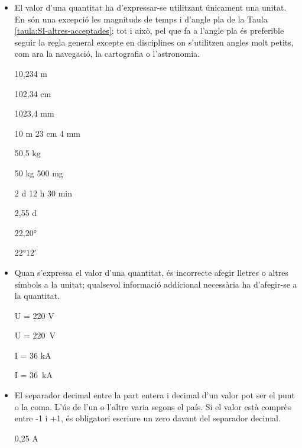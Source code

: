 \begin{itemize}
\textcolor{Red}\faTimesCircle{}   \qty{20}{\ohm.m} són 20 ohm  per metre

\textcolor{Red}\faTimesCircle{}   \qty{20}{\ohm.m} són 20 ohm multiplicat per metre


\item El valor d'una quantitat ha d'expressar-se  utilitzant únicament una unitat. En són una excepció les magnituds de temps i d'angle pla de la Taula \vref{taula:SI-altres-acceptades}; tot i això, pel que fa a l'angle pla és preferible seguir la regla general excepte en disciplines on s'utilitzen angles molt petits, com ara la navegació, la cartografia o l'astronomia.

\textcolor{Green}\faCheckSquare{} 10,234 m

\textcolor{Green}\faCheckSquare{} 102,34 cm

\textcolor{Green}\faCheckSquare{} 1023,4 mm

\textcolor{Red}\faTimesCircle{}  10 m 23 cm 4 mm

\textcolor{Green}\faCheckSquare{} 50,5 kg


\textcolor{Red}\faTimesCircle{}  50 kg 500 mg

\textcolor{Green}\faCheckSquare{} 2 d 12 h 30 min

\textcolor{Red}\faTimesCircle{}   2,55 d

\textcolor{Green}\faCheckSquare{} \ang{22,20}

\textcolor{Blue}\faExclamationTriangle{} \ang{22;12}

\item Quan s'expressa el valor d'una quantitat, és incorrecte afegir
lletres o altres símbols a la unitat; qualsevol informació
addicional necessària ha d'afegir-se a la quantitat.

\textcolor{Green}\faCheckSquare{} U = 220 V

\textcolor{Red}\faTimesCircle{}  U = \qty{220}{V}

\textcolor{Green}\faCheckSquare{}  I = 36 kA

\textcolor{Red}\faTimesCircle{}   I = \qty{36}{kA}


\item El separador decimal entre la part entera i decimal d'un valor pot ser el punt o la coma. L'ús de l'un o l'altre varia segons el país. Si el valor està comprès entre -1 i +1, és obligatori escriure un zero davant del separador decimal.

\textcolor{Green}\faCheckSquare{} 0,25 A


\end{itemize}
